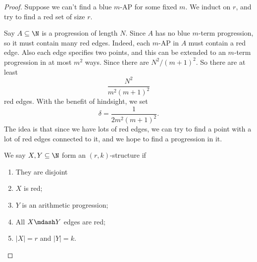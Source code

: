 \documentclass[a4paper]{article}
\begin{document}
\begin{proof}
  Suppose we can't find a blue $m$-AP for some fixed $m$. We induct on $r$, and try to find a red set of size $r$.

  Say $A \subseteq \N$ is a progression of length $N$. Since $A$ has no blue $m$-term progression, so it must contain many red edges. Indeed, each $m$-AP in $A$ must contain a red edge. Also each edge specifies two points, and this can be extended to an $m$-term progression in at most $m^2$ ways. Since there are $N^2/(m + 1)^2$. So there are at least
  \[
    \frac{N^2}{m^2(m + 1)^2}
  \]
  red edges. With the benefit of hindsight, we set
  \[
    \delta = \frac{1}{2m^2(m + 1)^2}.
  \]
  The idea is that since we have lots of red edges, we can try to find a point with a lot of red edges connected to it, and we hope to find a progression in it.

  We say $X, Y \subseteq \N$ form an $(r, k)$-structure if
  \begin{enumerate}
    \item They are disjoint
    \item $X$ is red;
    \item $Y$ is an arithmetic progression;
    \item All $X\mdash Y$ edges are red;
    \item $|X| = r$ and $|Y| = k$.
  \end{enumerate} %
  \begin{center}
\end{center}
\end{proof}
\end{document}
